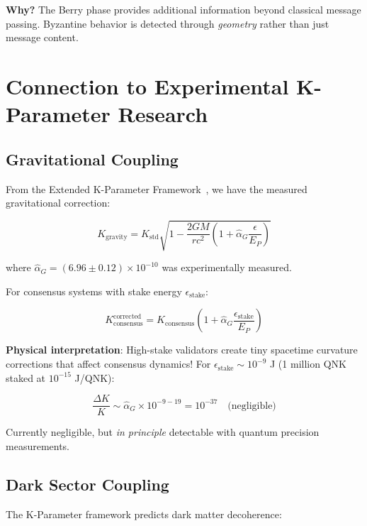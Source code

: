 \documentclass[11pt,a4paper,twoside]{article}
\begin{document}
\textbf{Why?} The Berry phase provides additional information beyond classical message passing. Byzantine behavior is detected through \textit{geometry} rather than just message content.

\newpage

\section{Connection to Experimental K-Parameter Research}

\subsection{Gravitational Coupling}

From the Extended K-Parameter Framework~\cite{kparameter2025}, we have the measured gravitational correction:

\begin{equation}
K_{\text{gravity}} = K_{\text{std}} \sqrt{1 - \frac{2GM}{rc^2}\left(1 + \hat{\alpha}_G \frac{\epsilon}{E_P}\right)}
\end{equation}

where $\hat{\alpha}_G = (6.96 \pm 0.12) \times 10^{-10}$ was experimentally measured.

For consensus systems with stake energy $\epsilon_{\text{stake}}$:

\begin{equation}
K_{\text{consensus}}^{\text{corrected}} = K_{\text{consensus}} \left(1 + \hat{\alpha}_G \frac{\epsilon_{\text{stake}}}{E_P}\right)
\end{equation}

\textbf{Physical interpretation}: High-stake validators create tiny spacetime curvature corrections that affect consensus dynamics! For $\epsilon_{\text{stake}} \sim 10^{-9}$ J (1 million QNK staked at $10^{-15}$ J/QNK):

\begin{equation}
\frac{\Delta K}{K} \sim \hat{\alpha}_G \times 10^{-9-19} = 10^{-37} \quad \text{(negligible)}
\end{equation}

Currently negligible, but \textit{in principle} detectable with quantum precision measurements.

\subsection{Dark Sector Coupling}

The K-Parameter framework predicts dark matter decoherence:
\end{document}
